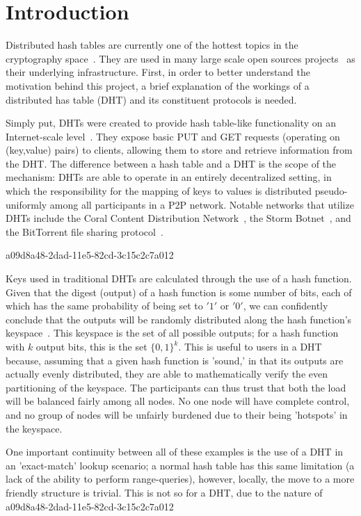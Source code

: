\documentclass[12pt]{article}
\begin{document}
\section{Introduction}
\par Distributed hash tables are currently one of the hottest topics in the cryptography space~\cite{Stoica:2001dj,Rowstron:2001ea,Ratnasamy:2001wn}. They are used in many large scale open sources projects~\cite{Freitas:2013tb,Xu:2010vs,Perfitt:2010fh} as their underlying infrastructure. First, in order to better understand the motivation behind this project, a brief explanation of the workings of a distributed has table (DHT) and its constituent protocols is needed.

\par Simply put, DHTs were created to provide hash table-like functionality on an Internet-scale level~\cite{Ratnasamy:2001wn}. They expose basic PUT and GET requests (operating on (key,value) pairs) to clients, allowing them to store and retrieve information from the DHT. The difference between a hash table and a DHT is the scope of the mechanism: DHTs are able to operate in an entirely decentralized setting, in which the responsibility for the mapping of keys to values is distributed pseudo-uniformly among all participants in a P2P network. Notable networks that utilize DHTs include the Coral Content Distribution Network~\cite{Freedman:2004vb}, the Storm Botnet~\cite{Holz:2008uk}, and the BitTorrent file sharing protocol~\cite{Cohen:y1_8mBnw}.

a09d8a48-2dad-11e5-82cd-3c15c2c7a012\par Keys used in traditional DHTs are calculated through the use of a hash function. Given that the digest (output) of a hash function is some number of bits, each of which has the same probability of being set to $'1'$ or $'0'$, we can confidently conclude that the outputs will be randomly distributed along the hash function's keyspace~. This keyspace is the set of all possible outputs; for a hash function with $k$ output bits, this is the set $\{0,1\}^k$. This is useful to users in a DHT because, assuming that a given hash function is 'sound,' in that its outputs are actually evenly distributed, they are able to mathematically verify the even partitioning of the keyspace. The participants can thus trust that both the load will be balanced fairly among all nodes. No one node will have complete control, and no group of nodes will be unfairly burdened due to their being 'hotspots' in the keyspace.~

\par One important continuity between all of these examples is the use of a DHT in an 'exact-match' lookup scenario; a normal hash table has this same limitation (a lack of the ability to perform range-queries), however, locally, the move to a more friendly structure is trivial. This is not so for a DHT, due to the nature of
a09d8a48-2dad-11e5-82cd-3c15c2c7a012\printbibliography
\end{document}
